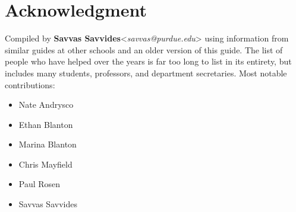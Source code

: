 \section{Acknowledgment}
Compiled by \textbf{Savvas Savvides}<\emph{savvas@purdue.edu}> using information from similar guides at other schools and an older version of this guide.
%
The list of people who have helped over the years is far too long to list in its entirety, but includes many students, professors, and department secretaries. Most notable contributions:

\begin{itemize}
\item Nate Andrysco
\item Ethan Blanton
\item Marina Blanton
\item Chris Mayfield
\item Paul Rosen
\item Savvas Savvides
\end{itemize}